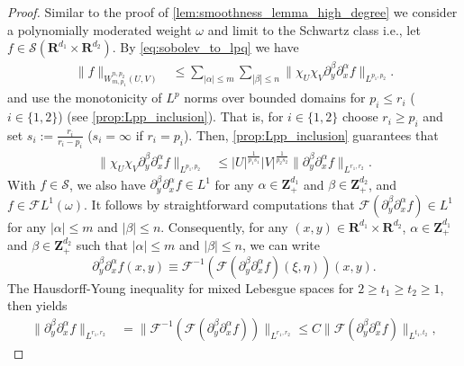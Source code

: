 \documentclass[a4paper]{article}
\newcommand{\rr}[1]{\mathbf{R}^{#1}}
\newcommand{\rrI}{\rr{d_1}}
\newcommand{\rrII}{\rr{d_2}}
\newcommand{\rrIxII}{\rrI\times\rrII}
\newcommand{\zzp}[1]{\mathbf{Z}_+^{#1}}
\newcommand{\norm}[2]{\|#1\|_{#2}}
\newcommand{\chF}[1]{\chi_{#1}}
\numberwithin{equation}{section}
\theoremstyle{remark}
\begin{document}
\begin{proof}
    Similar to the proof of \cref{lem:smoothness_lemma_high_degree}
    we consider a polynomially moderated weight $\omega$
    and limit to the Schwartz class
    i.e., let $f \in \mathscr{S}(\rrIxII)$.
    By \cref{eq:sobolev_to_lpq} we have
    \begin{align*}
        \norm{f}{W_{m,p_1}^{n, p_2}(U, V)}
        &\leq\sum_{|\alpha|\leq m}\sum_{|\beta|\leq n}\norm{\chF{U}\chF{V}\partial_y^\beta\partial_x^\alpha f}{L^{p_1,p_2}}.
    \end{align*}
    and use the monotonicity of \(L^p\) norms over bounded domains
    for \(p_i\leq r_i\) (\(i\in\{1,2\}\)) 
    (see \cref{prop:Lpp_inclusion}).
    That is, for \(i\in\{1,2\}\) choose \(r_i\geq p_i\)
    and set \(s_i:=\frac{r_i}{r_i-p_i}\) (\(s_i=\infty\) if \(r_i=p_i\)).
    Then, \cref{prop:Lpp_inclusion} guarantees that
    \begin{align*}
        \norm{\chF{U}\chF{V}\partial_y^\beta\partial_x^\alpha f}{L^{p_1,p_2}}
        &\leq|U|^{\frac{1}{p_1s_1}}|V|^{\frac{1}{p_2s_2}}\norm{\partial_y^\beta\partial_x^\alpha f}{L^{r_1,r_2}}.
    \end{align*}
    With $f\in\mathscr{S}$, we also have 
    $\partial_y^\beta \partial_x^\alpha f \in L^1$
    for any $\alpha\in\zzp{d_1}$ and $\beta\in\zzp{d_2}$,
    and
    \(f \in \mathscr{F}L^{1}(\omega)\).
    It follows by straightforward computations that 
    $\mathscr{F}(\partial_y^\beta \partial_x^\alpha f )\in L^1$
    for any $|\alpha|\leq m$ and $|\beta| \leq n$.
    Consequently, for any $(x,y)\in \rrIxII$, $\alpha \in \zzp{d_1}$
    and $\beta \in \zzp{d_2}$
    such that $|\alpha|\leq m$ and $|\beta| \leq n$,
    we can write 
     \begin{equation*}
        \partial_y^\beta \partial_x^\alpha f(x,y)
        \equiv 
        \mathscr{F}^{-1}\left(
                \mathscr{F}(\partial_y^\beta \partial_x^\alpha f )(\xi,\eta)
                        \right)(x,y).
     \end{equation*}
    The Hausdorff-Young inequality for mixed Lebesgue spaces \cite[Section 12]{Benedek61SpaceMixedNorm} for $2\geq t_1\geq t_2\geq 1$,
    then yields
    \begin{align*}
        \norm{\partial_y^\beta\partial_x^\alpha f}{L^{r_1,r_2}}
        &=\norm{\mathscr{F}^{-1}\left(\mathscr{F}\left(\partial_y^\beta\partial_x^\alpha f\right)\right)}{L^{r_1,r_2}}
        \leq C\norm{\mathscr{F}\left(\partial_y^\beta\partial_x^\alpha f\right)}{L^{t_1,t_2}},
    \end{align*}

\end{proof}
\end{document}
